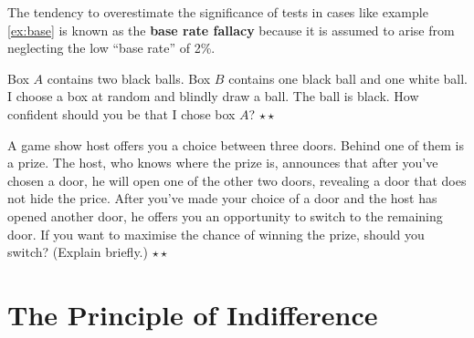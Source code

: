 The tendency to overestimate the significance of tests in cases like example
\ref{ex:base} is known as the \textbf{base rate fallacy} because it is
assumed to arise from neglecting the low ``base rate'' of 2\%.

\begin{exercise}
  Box $A$ contains two black balls. Box $B$ contains one black ball
  and one white ball. I choose a box at random and blindly draw a
  ball. The ball is black. How confident should you be that I chose
  box $A$? $\star\star$
\end{exercise}


\begin{exercise}\label{ex-montyhall}
  A game show host offers you a choice between three doors. Behind one
  of them is a prize. The host, who knows where the prize is,
  announces that after you've chosen a door, he will open one of the
  other two doors, revealing a door that does not hide the
  price. After you've made your choice of a door and the host has
  opened another door, he offers you an opportunity to switch to the
  remaining door. If you want to maximise the chance of winning the
  prize, should you switch? (Explain briefly.) $\star\star$
\end{exercise}




\section{The Principle of Indifference}

